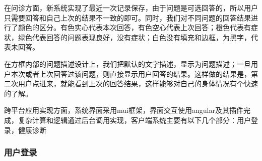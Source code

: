 在问诊方面，新系统实现了最近一次记录保存，由于问题是可选回答的，所以用户只需要回答和自己上次的结果不一致的即可。同时，我们对不同问题的回答结果进行了颜色的区分。有色实心代表本次回答，有色空心代表上次回答；橙色代表有症状，绿色代表回答的问题表现良好，没有症状；白色没有填充和边框，为黑字，代表未回答。

在方框内部的问题描述设计上，我们把默认的文字描述，显示为问题描述；一旦用户本次或者上次回答过该问题，则直接显示用户回答的结果。这样做的结果是，第二次用户点进来，就能看到上次的回答结果，这样能够对自己的身体情况有个快速的了解。

跨平台应用实现方面，系统界面采用mui框架，界面交互使用angular及其插件完成，复杂计算和逻辑通过后台调用实现，客户端系统主要有以下几个部分：用户登录，健康诊断
\subsubsection{用户登录}
